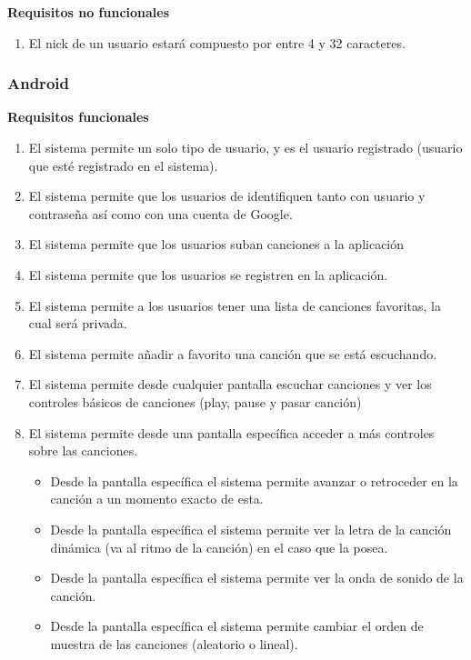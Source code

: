 \documentclass[12pt]{article}%
\begin{document}
\textbf{Requisitos no funcionales}
\begin{enumerate}
	\item El nick de un usuario estar\'a compuesto por entre 4 y 32 caracteres.\\
	
\end{enumerate}

\subsubsection{Android}

\textbf{Requisitos funcionales}
\begin{enumerate}
	\item El sistema permite un solo tipo de usuario, y es el usuario registrado (usuario que est\'e registrado en el sistema).
	\item El sistema permite que los usuarios de identifiquen tanto con usuario y contraseña as\'i como con una cuenta de Google.
	\item  El sistema permite que los usuarios suban canciones a la aplicaci\'on
	\item  El sistema permite que los usuarios se registren en la aplicaci\'on.
	\item  El sistema permite a los usuarios tener una lista de canciones favoritas, la cual ser\'a privada.
	\item  El sistema permite añadir a favorito una canci\'on que se est\'a escuchando.
	\item  El sistema permite desde cualquier pantalla escuchar canciones y ver los controles b\'asicos de canciones (play, pause y pasar canci\'on)
	\item  El sistema permite desde una pantalla espec\'ifica acceder a m\'as controles sobre las canciones.
	\begin{itemize}
		\item  Desde la pantalla espec\'ifica el sistema permite avanzar o retroceder en la canci\'on a un momento exacto de esta.
		\item  Desde la pantalla espec\'ifica el sistema permite ver la letra de la canci\'on din\'amica (va al ritmo de la canci\'on) en el caso que la posea.
		\item  Desde la pantalla espec\'ifica el sistema permite ver la onda de sonido de la canci\'on.
		\item  Desde la pantalla espec\'ifica el sistema permite cambiar el orden de muestra de las canciones (aleatorio o lineal).
	\end{itemize}
	

\end{enumerate}
\end{document}
